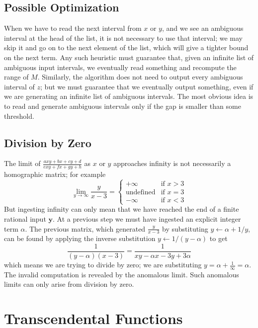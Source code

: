 \documentclass[11pt, oneside]{amsart}   	%
\renewcommand{\:}{\negthickspace:\negthickspace}
\begin{document}
\subsection{Possible Optimization}
When we have to read the next interval from $x$ or $y$, and we see an ambiguous interval at the head of the list, it is not necessary
to use that interval; we may skip it and go on to the next element of the list, which will give a tighter bound on the next term.
Any such heuristic must guarantee that, given an infinite list of ambiguous input intervals, we eventually read something
and recompute the range of $M$. Similarly, the
algorithm does not need to output every ambiguous interval of $z$; but  we must guarantee that we eventually output something,
even if we are generating an infinite list of ambiguous intervals. The most obvious idea is to read and generate ambiguous intervals only if the gap is smaller than some threshold.

\subsection{Division by Zero}\label{sec:anomalous}
The limit of $\frac{axy + bx + cy + d}{exy + fx + gy + h}$ as $x$ or $y$ approaches infinity is not necessarily a homographic matrix; for example
\[
\lim_{y \to \infty} \frac{y}{x-3} = \begin{cases}
                                                          +\infty & \mbox{if } x > 3 \\
                                                          \mbox{undefined} & \mbox{if } x=3 \\
                                                          -\infty & \mbox{if } x < 3
                                                         \end{cases}
\]
But ingesting infinity can only mean that we have reached the end of a finite rational input $\mathbf{y}$. At a previous step we
must have ingested an explicit integer term $\alpha$. The previous matrix, which generated $\frac{y}{x-3}$ by substituting $y \leftarrow \alpha + 1/y$, can be found by applying the inverse substitution $y \leftarrow 1/(y-\alpha)$ to get
\[
\frac{1}{(y-\alpha)(x-3)} = \frac{1}{xy - \alpha x -3y +3\alpha}
\]
which means we are trying to divide by zero; we are substituting $y = \alpha + \frac{1}{\infty} = \alpha$. The invalid computation is revealed by the anomalous limit.
Such anomalous limits can only arise from division by zero.


\section{Transcendental Functions}
\end{document}
